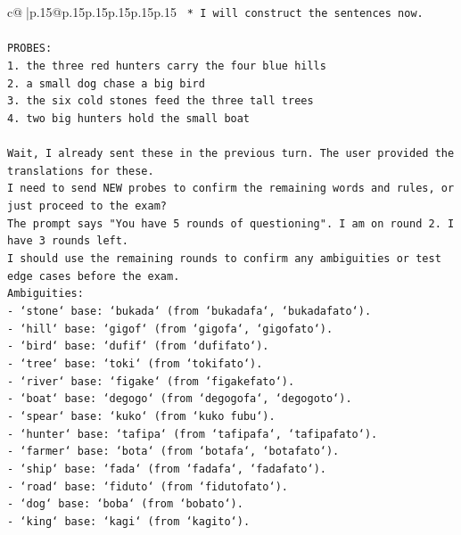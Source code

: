 \documentclass{article}
\begin{document}
{\begin{supertabular}{c@{$\;$}|p{.15\linewidth}@{}p{.15\linewidth}p{.15\linewidth}p{.15\linewidth}p{.15\linewidth}p{.15\linewidth}}
{{{\texttt{    *   I will construct the sentences now.} \\
\\ 
\texttt{PROBES:} \\
\texttt{1. the three red hunters carry the four blue hills} \\
\texttt{2. a small dog chase a big bird} \\
\texttt{3. the six cold stones feed the three tall trees} \\
\texttt{4. two big hunters hold the small boat} \\
\\ 
\texttt{Wait, I already sent these in the previous turn. The user provided the translations for these.} \\
\texttt{I need to send NEW probes to confirm the remaining words and rules, or just proceed to the exam?} \\
\texttt{The prompt says "You have 5 rounds of questioning". I am on round 2. I have 3 rounds left.} \\
\texttt{I should use the remaining rounds to confirm any ambiguities or test edge cases before the exam.} \\
\texttt{Ambiguities:} \\
\texttt{{-} `stone` base: `bukada` (from `bukadafa`, `bukadafato`).} \\
\texttt{{-} `hill` base: `gigof` (from `gigofa`, `gigofato`).} \\
\texttt{{-} `bird` base: `dufif` (from `dufifato`).} \\
\texttt{{-} `tree` base: `toki` (from `tokifato`).} \\
\texttt{{-} `river` base: `figake` (from `figakefato`).} \\
\texttt{{-} `boat` base: `degogo` (from `degogofa`, `degogoto`).} \\
\texttt{{-} `spear` base: `kuko` (from `kuko fubu`).} \\
\texttt{{-} `hunter` base: `tafipa` (from `tafipafa`, `tafipafato`).} \\
\texttt{{-} `farmer` base: `bota` (from `botafa`, `botafato`).} \\
\texttt{{-} `ship` base: `fada` (from `fadafa`, `fadafato`).} \\
\texttt{{-} `road` base: `fiduto` (from `fidutofato`).} \\
\texttt{{-} `dog` base: `boba` (from `bobato`).} \\
\texttt{{-} `king` base: `kagi` (from `kagito`).} \\
}}}
\end{supertabular}}
\end{document}
